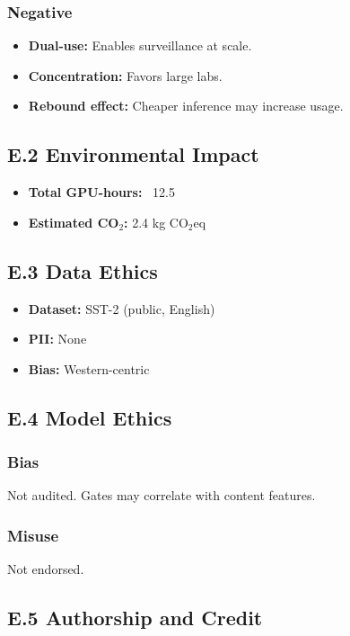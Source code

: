 \subsubsection{Negative}
\begin{itemize}
\item \textbf{Dual-use:} Enables surveillance at scale.
\item \textbf{Concentration:} Favors large labs.
\item \textbf{Rebound effect:} Cheaper inference may increase usage.

\end{itemize}
\subsection{E.2 Environmental Impact}

\begin{itemize}
\item \textbf{Total GPU-hours:} ~12.5
\item \textbf{Estimated CO$_2$:} 2.4 kg CO$_2$eq

\end{itemize}
\subsection{E.3 Data Ethics}

\begin{itemize}
\item \textbf{Dataset:} SST-2 (public, English)
\item \textbf{PII:} None
\item \textbf{Bias:} Western-centric

\end{itemize}
\subsection{E.4 Model Ethics}

\subsubsection{Bias}
Not audited. Gates may correlate with content features.

\subsubsection{Misuse}
Not endorsed.

\subsection{E.5 Authorship and Credit}

